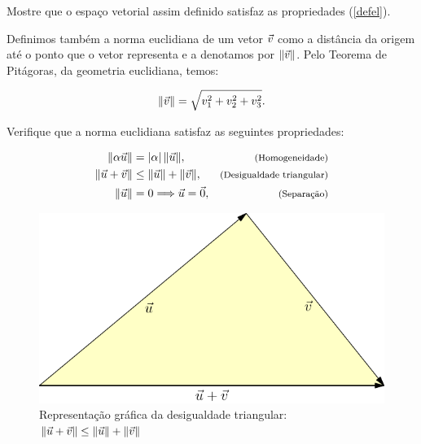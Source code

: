\begin{exer} Mostre que o espaço vetorial assim definido satisfaz as propriedades (\ref{defel}).
\end{exer}

Definimos também a norma euclidiana de um vetor $\vec{v}$ como a distância da origem até o ponto que o vetor representa e a denotamos por $\|\vec{v}\|$. Pelo Teorema de Pitágoras, da geometria euclidiana, temos:


\begin{equation}\label{defnorma}\|\vec{v}\|=\sqrt{v_1^2+v_2^2+v_3^2}.\end{equation}
\begin{exer}\label{exnorma}Verifique que a norma euclidiana satisfaz as seguintes propriedades:
  
\begin{subequations}\label{propnorma}
\begin{align}
\|\alpha \vec{u}\|&=|\alpha|~\!\|\vec{u}\|,&\hbox{\footnotesize (Homogeneidade)}\label{propnormahom}\\
\|\vec{u}+\vec{v}\|&\leq \|\vec{u}\|+\|\vec{v}\|,&\hbox{\footnotesize (Desigualdade triangular)}\label{propnormatri}\\
\|\vec{u}\|&=0 \Longrightarrow \vec{u}=\vec{0},&\hbox{\footnotesize (Separação)}\label{propnormasep}
\end{align}
\end{subequations}
\end{exer}

\begin{figure}%
 \includegraphics{./cap_algvet/pics/desigualdade_triangulo}
      \caption{Representação gráfica da desigualdade triangular: $\|\vec{u}+\vec{v}\|\leq \|\vec{u}\|+\|\vec{v}\|$}
      \label{fig:des_triang}
   \end{figure}

